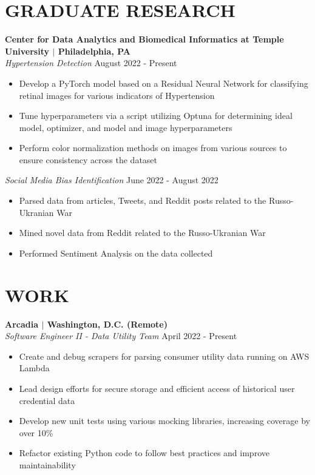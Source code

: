 \documentclass[line,resmargin]{res}
\begin{document}
\begin{resume}
\section{GRADUATE RESEARCH}

\textbf{Center for Data Analytics and Biomedical Informatics at Temple University $|$ Philadelphia, PA} \\
{\sl Hypertension Detection} \hfill August 2022 - Present
\begin{itemize} \itemsep -2pt %
	\item Develop a PyTorch model based on a Residual Neural Network for classifying retinal images for various indicators of Hypertension
	\item Tune hyperparameters via a script utilizing Optuna for determining ideal model, optimizer, and model and image hyperparameters
	\item Perform color normalization methods on images from various sources to ensure consistency across the dataset
\end{itemize}
{\sl Social Media Bias Identification} \hfill June 2022 - August 2022
\begin{itemize} \itemsep -2pt %
	\item Parsed data from articles, Tweets, and Reddit posts related to the Russo-Ukranian War
	\item Mined novel data from Reddit related to the Russo-Ukranian War
	\item Performed Sentiment Analysis on the data collected
\end{itemize}

 
\section{WORK}
\textbf{Arcadia $|$ Washington, D.C. (Remote)} \\
{\sl Software Engineer II - Data Utility Team} \hfill April 2022 - Present
\begin{itemize} \itemsep -2pt %
	\item Create and debug scrapers for parsing consumer utility data running on AWS Lambda
	\item Lead design efforts for secure storage and efficient access of historical user credential data
	\item Develop new unit tests using various mocking libraries, increasing coverage by over 10\%
	\item Refactor existing Python code to follow best practices and improve maintainability
\end{itemize}


\end{resume}
\end{document}
